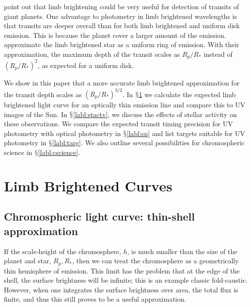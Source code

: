 \documentclass[manuscript]{aastex}
\begin{document}
\citet{assef} point out that limb brightening could be
very useful for detection of transits of giant planets. One advantage
to photometry in limb brightened wavelengths is that transits are
deeper overall than for both limb brightened and uniform disk
emission. This is because the planet cover a larger amount of the
emission. \citet{assef} approximate the limb brightened
star as a uniform ring of emission. With their approximation, the maximum depth
of the transit scales as $R_p/R_*$ instead of $(R_p/R_*)^2$,
as expected for a uniform disk.

We show in this paper that a more accurate limb brightened
approximation for the transit depth scales as $(R_p/R_*)^{3/2}$. In
$\mathsection$\ref{labl:chromlcurve} we calculate the expected limb
brightened light curve for an optically thin emission line and compare
this to UV images of the Sun. In $\mathsection$\ref{labl:stactv}, we
discuss the effects of stellar activity on these observations. We
compare the expected transit timing precision for UV photometry with
optical photometry in $\mathsection$\ref{labl:sn} and list targets
suitable for UV photometry in $\mathsection$\ref{labl:targ}. We also
outline several possibilities for chromospheric science in
$\mathsection$\ref{labl:cscience}.

\section{Limb Brightened Curves} \label{labl:chromlcurve}

\subsection{Chromospheric light curve: thin-shell approximation}
\label{labl:thinshell}
If the scale-height of the chromosphere, $h$, is much smaller than the
size of the planet and star, $R_p, R_*$, then we can treat the
chromosphere as a geometrically thin hemisphere of emission.  This
limit has the problem that at the edge of the shell, the surface
brightness will be infinite; this is an example classic fold-caustic.
However, when one integrates the surface brightness over area, the
total flux is finite, and thus this still proves to be a useful
approximation.

\end{document}
